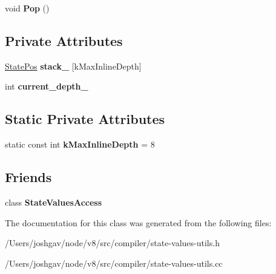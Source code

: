 \begin{DoxyCompactItemize}
\item 
void {\bfseries Pop} ()\hypertarget{classv8_1_1internal_1_1compiler_1_1_state_values_access_1_1iterator_abd4cc3ee73627678fbec874882de942d}{}\label{classv8_1_1internal_1_1compiler_1_1_state_values_access_1_1iterator_abd4cc3ee73627678fbec874882de942d}

\end{DoxyCompactItemize}
\subsection*{Private Attributes}
\begin{DoxyCompactItemize}
\item 
\hyperlink{structv8_1_1internal_1_1compiler_1_1_state_values_access_1_1iterator_1_1_state_pos}{State\+Pos} {\bfseries stack\+\_\+} \mbox{[}k\+Max\+Inline\+Depth\mbox{]}\hypertarget{classv8_1_1internal_1_1compiler_1_1_state_values_access_1_1iterator_a6d3d353607f58ea2e66062f9a109cd17}{}\label{classv8_1_1internal_1_1compiler_1_1_state_values_access_1_1iterator_a6d3d353607f58ea2e66062f9a109cd17}

\item 
int {\bfseries current\+\_\+depth\+\_\+}\hypertarget{classv8_1_1internal_1_1compiler_1_1_state_values_access_1_1iterator_a131ccfa2375dd2619d0d3c5b23dcf9b1}{}\label{classv8_1_1internal_1_1compiler_1_1_state_values_access_1_1iterator_a131ccfa2375dd2619d0d3c5b23dcf9b1}

\end{DoxyCompactItemize}
\subsection*{Static Private Attributes}
\begin{DoxyCompactItemize}
\item 
static const int {\bfseries k\+Max\+Inline\+Depth} = 8\hypertarget{classv8_1_1internal_1_1compiler_1_1_state_values_access_1_1iterator_a7c274dc1e27a4f38712a2868d2191297}{}\label{classv8_1_1internal_1_1compiler_1_1_state_values_access_1_1iterator_a7c274dc1e27a4f38712a2868d2191297}

\end{DoxyCompactItemize}
\subsection*{Friends}
\begin{DoxyCompactItemize}
\item 
class {\bfseries State\+Values\+Access}\hypertarget{classv8_1_1internal_1_1compiler_1_1_state_values_access_1_1iterator_a0cdd3c53962ccca30c4cc916410f12ef}{}\label{classv8_1_1internal_1_1compiler_1_1_state_values_access_1_1iterator_a0cdd3c53962ccca30c4cc916410f12ef}

\end{DoxyCompactItemize}


The documentation for this class was generated from the following files\+:\begin{DoxyCompactItemize}
\item 
/\+Users/joshgav/node/v8/src/compiler/state-\/values-\/utils.\+h\item 
/\+Users/joshgav/node/v8/src/compiler/state-\/values-\/utils.\+cc\end{DoxyCompactItemize}
